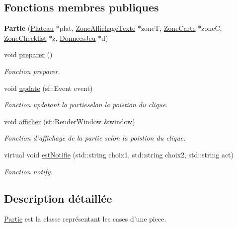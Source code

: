 \subsection*{\-Fonctions membres publiques}
\begin{DoxyCompactItemize}
\item 
\hypertarget{classPartie_a1d763e94586edfdaa54cce895287f695}{{\bfseries \-Partie} (\hyperlink{classPlateau}{\-Plateau} $\ast$plat, \hyperlink{classZoneAffichageTexte}{\-Zone\-Affichage\-Texte} $\ast$zone\-T, \hyperlink{classZoneCarte}{\-Zone\-Carte} $\ast$zone\-C, \hyperlink{classZoneChecklist}{\-Zone\-Checklist} $\ast$z, \hyperlink{classDonneesJeu}{\-Donnees\-Jeu} $\ast$d)}\label{classPartie_a1d763e94586edfdaa54cce895287f695}

\item 
\hypertarget{classPartie_ab76c25c57551613a708ab39816d14a9a}{void \hyperlink{classPartie_ab76c25c57551613a708ab39816d14a9a}{preparer} ()}\label{classPartie_ab76c25c57551613a708ab39816d14a9a}

\begin{DoxyCompactList}\small\item\em \-Fonction preparer. \end{DoxyCompactList}\item 
void \hyperlink{classPartie_a2c868f423c455e1aa0aebc9f3482cf8d}{update} (sf\-::\-Event event)
\begin{DoxyCompactList}\small\item\em \-Fonction updatant la partieselon la poistion du clique. \end{DoxyCompactList}\item 
void \hyperlink{classPartie_a2c00254bdd417a300342d1ba1eb5cec3}{afficher} (sf\-::\-Render\-Window \&window)
\begin{DoxyCompactList}\small\item\em \-Fonction d'affichage de la partie selon la poistion du clique. \end{DoxyCompactList}\item 
virtual void \hyperlink{classPartie_a39dcf2ff1dc8f4c7c81edea5e4f2cde8}{est\-Notifie} (std\-::string choix1, std\-::string choix2, std\-::string act)
\begin{DoxyCompactList}\small\item\em \-Fonction notify. \end{DoxyCompactList}\end{DoxyCompactItemize}


\subsection{\-Description détaillée}
\hyperlink{classPartie}{\-Partie} est la classe représentant les cases d'une piece. 


